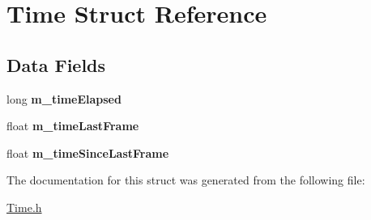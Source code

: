 \hypertarget{structTime}{\section{\-Time \-Struct \-Reference}
\label{structTime}
}
\subsection*{\-Data \-Fields}
\begin{DoxyCompactItemize}
\item 
\hypertarget{structTime_aa0775ca6db64c43f47a679cfff5fb67f}{long {\bfseries m\-\_\-time\-Elapsed}}\label{structTime_aa0775ca6db64c43f47a679cfff5fb67f}

\item 
\hypertarget{structTime_a957f9578a91b83b2a75410d4f495354c}{float {\bfseries m\-\_\-time\-Last\-Frame}}\label{structTime_a957f9578a91b83b2a75410d4f495354c}

\item 
\hypertarget{structTime_ad43dbd983c2078ae176c0b53870fee21}{float {\bfseries m\-\_\-time\-Since\-Last\-Frame}}\label{structTime_ad43dbd983c2078ae176c0b53870fee21}

\end{DoxyCompactItemize}


\-The documentation for this struct was generated from the following file\-:\begin{DoxyCompactItemize}
\item 
\hyperlink{Time_8h}{\-Time.\-h}\end{DoxyCompactItemize}
